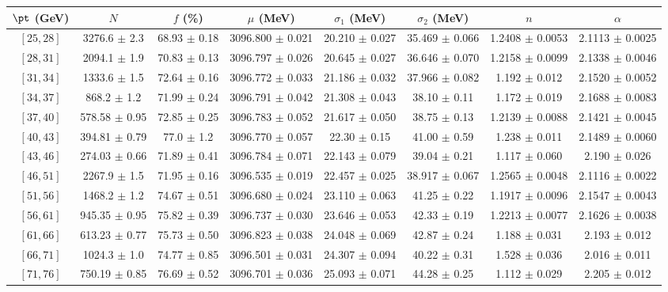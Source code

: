 \begin{tabular}{c||c|c|c|c|c|c|c}
$\pt$ (GeV) & $N$ & $f$ (\%) & $\mu$ (MeV) & $\sigma_1$ (MeV) & $\sigma_2$ (MeV) & $n$ & $\alpha$ \\
\hline
$[25, 28]$ & 3276.6 $\pm$ 2.3 & 68.93 $\pm$ 0.18 & 3096.800 $\pm$ 0.021 & 20.210 $\pm$ 0.027 & 35.469 $\pm$ 0.066 & 1.2408 $\pm$ 0.0053 & 2.1113 $\pm$ 0.0025\\
$[28, 31]$ & 2094.1 $\pm$ 1.9 & 70.83 $\pm$ 0.13 & 3096.797 $\pm$ 0.026 & 20.645 $\pm$ 0.027 & 36.646 $\pm$ 0.070 & 1.2158 $\pm$ 0.0099 & 2.1338 $\pm$ 0.0046\\
$[31, 34]$ & 1333.6 $\pm$ 1.5 & 72.64 $\pm$ 0.16 & 3096.772 $\pm$ 0.033 & 21.186 $\pm$ 0.032 & 37.966 $\pm$ 0.082 & 1.192 $\pm$ 0.012 & 2.1520 $\pm$ 0.0052\\
$[34, 37]$ & 868.2 $\pm$ 1.2 & 71.99 $\pm$ 0.24 & 3096.791 $\pm$ 0.042 & 21.308 $\pm$ 0.043 & 38.10 $\pm$ 0.11 & 1.172 $\pm$ 0.019 & 2.1688 $\pm$ 0.0083\\
$[37, 40]$ & 578.58 $\pm$ 0.95 & 72.85 $\pm$ 0.25 & 3096.783 $\pm$ 0.052 & 21.617 $\pm$ 0.050 & 38.75 $\pm$ 0.13 & 1.2139 $\pm$ 0.0088 & 2.1421 $\pm$ 0.0045\\
$[40, 43]$ & 394.81 $\pm$ 0.79 & 77.0 $\pm$ 1.2 & 3096.770 $\pm$ 0.057 & 22.30 $\pm$ 0.15 & 41.00 $\pm$ 0.59 & 1.238 $\pm$ 0.011 & 2.1489 $\pm$ 0.0060\\
$[43, 46]$ & 274.03 $\pm$ 0.66 & 71.89 $\pm$ 0.41 & 3096.784 $\pm$ 0.071 & 22.143 $\pm$ 0.079 & 39.04 $\pm$ 0.21 & 1.117 $\pm$ 0.060 & 2.190 $\pm$ 0.026\\
$[46, 51]$ & 2267.9 $\pm$ 1.5 & 71.95 $\pm$ 0.16 & 3096.535 $\pm$ 0.019 & 22.457 $\pm$ 0.025 & 38.917 $\pm$ 0.067 & 1.2565 $\pm$ 0.0048 & 2.1116 $\pm$ 0.0022\\
$[51, 56]$ & 1468.2 $\pm$ 1.2 & 74.67 $\pm$ 0.51 & 3096.680 $\pm$ 0.024 & 23.110 $\pm$ 0.063 & 41.25 $\pm$ 0.22 & 1.1917 $\pm$ 0.0096 & 2.1547 $\pm$ 0.0043\\
$[56, 61]$ & 945.35 $\pm$ 0.95 & 75.82 $\pm$ 0.39 & 3096.737 $\pm$ 0.030 & 23.646 $\pm$ 0.053 & 42.33 $\pm$ 0.19 & 1.2213 $\pm$ 0.0077 & 2.1626 $\pm$ 0.0038\\
$[61, 66]$ & 613.23 $\pm$ 0.77 & 75.73 $\pm$ 0.50 & 3096.823 $\pm$ 0.038 & 24.048 $\pm$ 0.069 & 42.87 $\pm$ 0.24 & 1.188 $\pm$ 0.031 & 2.193 $\pm$ 0.012\\
$[66, 71]$ & 1024.3 $\pm$ 1.0 & 74.77 $\pm$ 0.85 & 3096.501 $\pm$ 0.031 & 24.307 $\pm$ 0.094 & 40.22 $\pm$ 0.31 & 1.528 $\pm$ 0.036 & 2.016 $\pm$ 0.011\\
$[71, 76]$ & 750.19 $\pm$ 0.85 & 76.69 $\pm$ 0.52 & 3096.701 $\pm$ 0.036 & 25.093 $\pm$ 0.071 & 44.28 $\pm$ 0.25 & 1.112 $\pm$ 0.029 & 2.205 $\pm$ 0.012\\

\end{tabular}

